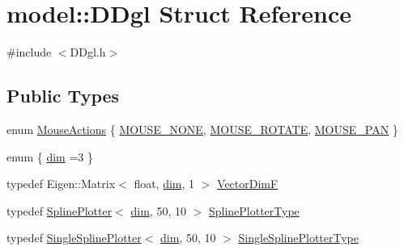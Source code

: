 \hypertarget{structmodel_1_1_d_dgl}{}\section{model\+:\+:D\+Dgl Struct Reference}
\label{structmodel_1_1_d_dgl}


{\ttfamily \#include $<$D\+Dgl.\+h$>$}

\subsection*{Public Types}
\begin{DoxyCompactItemize}
\item 
enum \hyperlink{structmodel_1_1_d_dgl_a75a4f7f76c2ef6659a294b0fd96e5433}{Mouse\+Actions} \{ \hyperlink{structmodel_1_1_d_dgl_a75a4f7f76c2ef6659a294b0fd96e5433afe2867c1c6b65bc052004ccef15f2065}{M\+O\+U\+S\+E\+\_\+\+N\+O\+N\+E}, 
\hyperlink{structmodel_1_1_d_dgl_a75a4f7f76c2ef6659a294b0fd96e5433a5f7fbcf9b5f238865f012bcbc98b8915}{M\+O\+U\+S\+E\+\_\+\+R\+O\+T\+A\+T\+E}, 
\hyperlink{structmodel_1_1_d_dgl_a75a4f7f76c2ef6659a294b0fd96e5433a8d8c591c1385689630427e820c67cd17}{M\+O\+U\+S\+E\+\_\+\+P\+A\+N}
 \}
\item 
enum \{ \hyperlink{structmodel_1_1_d_dgl_a1f5dd296ca989518a7c4fbf64f806d83ae512fd775be1f111c52fac52708128a1}{dim} =3
 \}
\item 
typedef Eigen\+::\+Matrix$<$ float, \hyperlink{structmodel_1_1_d_dgl_a1f5dd296ca989518a7c4fbf64f806d83ae512fd775be1f111c52fac52708128a1}{dim}, 1 $>$ \hyperlink{structmodel_1_1_d_dgl_a62488dd3f15b5fdbc3af48f939d14315}{Vector\+Dim\+F}
\item 
typedef \hyperlink{classmodel_1_1_spline_plotter}{Spline\+Plotter}$<$ \hyperlink{structmodel_1_1_d_dgl_a1f5dd296ca989518a7c4fbf64f806d83ae512fd775be1f111c52fac52708128a1}{dim}, 50, 10 $>$ \hyperlink{structmodel_1_1_d_dgl_aecff5e88105f42e8ba511771664a9fed}{Spline\+Plotter\+Type}
\item 
typedef \hyperlink{classmodel_1_1_single_spline_plotter}{Single\+Spline\+Plotter}$<$ \hyperlink{structmodel_1_1_d_dgl_a1f5dd296ca989518a7c4fbf64f806d83ae512fd775be1f111c52fac52708128a1}{dim}, 50, 10 $>$ \hyperlink{structmodel_1_1_d_dgl_ae494f51463346f19c7f000e2dd295eb3}{Single\+Spline\+Plotter\+Type}
\end{DoxyCompactItemize}
